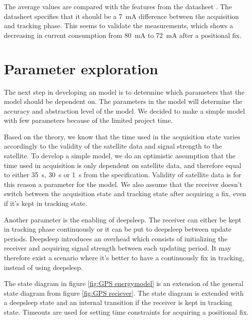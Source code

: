 The average values are compared with the features from the datasheet \cite{L76}. The datasheet specifies that it should be a 7 \,mA difference between the acquisition and tracking phase. This seems to validate the measurements, which shows a decreasing in current consumption from 80 \,mA to 72 \,mA after a positional fix.   
\section{Parameter exploration}
The next step in developing an model is to determine which parameters that the model should be dependent on. The parameters in the model will determine the accuracy and abstraction level of the model. We decided to make a simple model with few parameters because of the limited project time.

Based on the theory, we know that the time used in the acquisition state varies accordingly to the validity of the satellite data and signal strength to the satellite. To develop a simple model, we do an optimistic assumption that the time used in acquisition is only dependent on satellite data, and therefore equal to either 35 \,s, 30 \,s or 1 \,s from the specification\cite{L76}. Validity of satellite data is for this reason a parameter for the model. We also assume that the receiver doesn't switch between the acquisition state and tracking state after acquiring a fix, even if it's kept in tracking state. 

Another parameter is the enabling of deepsleep. The receiver can either be kept in tracking phase continuously or it can be put to deepsleep between update periods. Deepsleep introduces an overhead which consists of initializing the receiver and acquiring signal strength between each updating period. It may therefore exist a scenario where it's better to have a continuously fix in tracking, instead of using deepsleep. 

The state diagram in figure \ref{fig:GPS energymodel} is an extension of the general state diagram from figure \ref{fig:GPS reciever}. The state diagram is extended with a deepsleep state and an internal transition if the receiver is kept in tracking state. Timeouts are used for setting time constraints for acquiring a positional fix. 

